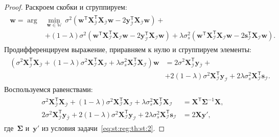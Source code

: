 \documentclass{dissert}
\begin{document}
\begin{proof}
Раскроем скобки и сгруппируем:
\begin{gather}
\label{eq:st:reg:3}
\begin{aligned}
\hat{\mathbf{w}} = \arg&\min_{\mathbf{w}\in \mathbb{W}} ~ \sigma^2\left(\mathbf{w}^{\mathsf{T}}\mathbf{X}^{\mathsf{T}}_{\bar{\mathcal{I}}}\mathbf{X}_{\bar{\mathcal{I}}}\mathbf{w} - 2\mathbf{y}^{\mathsf{T}}_{\bar{\mathcal{I}}}\mathbf{X}_{\bar{\mathcal{I}}}\mathbf{w}\right) +\\
&+ \left(1-\lambda\right)\sigma^2\left(\mathbf{w}^{\mathsf{T}}\mathbf{X}^{\mathsf{T}}_{\mathcal{I}}\mathbf{X}_{\mathcal{I}}\mathbf{w}- 2\mathbf{y}^{\mathsf{T}}_{\mathcal{I}}\mathbf{X}_{\mathcal{I}}\mathbf{w}\right) + \lambda\sigma^2_s\left(\mathbf{w}^{\mathsf{T}}\mathbf{X}^{\mathsf{T}}_{\mathcal{I}}\mathbf{X}_{\mathcal{I}}\mathbf{w}- 2\mathbf{s}^{\mathsf{T}}_{\mathcal{I}}\mathbf{X}_{\mathcal{I}}\mathbf{w}\right).
\end{aligned}
\end{gather}
Продифференцируем выражение, приравняем к нулю и сгруппируем элементы:
\begin{gather}
\label{eq:st:reg:4}
\begin{aligned}
\left(\sigma^{2}\mathbf{X}^{\mathsf{T}}_{\bar{\mathcal{I}}}\mathbf{X}_{\bar{\mathcal{I}}} + \left(1-\lambda\right)\sigma^2\mathbf{X}^{\mathsf{T}}_{\mathcal{I}}\mathbf{X}_{\mathcal{I}} + \lambda\sigma^{2}_s\mathbf{X}^{\mathsf{T}}_{\mathcal{I}}\mathbf{X}_{\mathcal{I}}\right) \mathbf{w}& = 2\sigma^2\mathbf{X}^{\mathsf{T}}_{\bar{\mathcal{I}}}\mathbf{y}_{\bar{\mathcal{I}}}+\\
&+ 2\left(1-\lambda\right)\sigma^2\mathbf{X}^{\mathsf{T}}_{\mathcal{I}}\mathbf{y}_{\mathcal{I}} + 2\lambda\sigma_s^2\mathbf{X}^{\mathsf{T}}_{\mathcal{I}}\mathbf{s}_{\mathcal{I}}.
\end{aligned}
\end{gather}
Воспользуемся равенствами:
\begin{gather}
\label{eq:st:reg:simp}
\begin{aligned}
\sigma^{2}\mathbf{X}^{\mathsf{T}}_{\bar{\mathcal{I}}}\mathbf{X}_{\bar{\mathcal{I}}} + \left(1-\lambda\right)\sigma^2\mathbf{X}^{\mathsf{T}}_{\mathcal{I}}\mathbf{X}_{\mathcal{I}} + \lambda\sigma^{2}_s\mathbf{X}^{\mathsf{T}}_{\mathcal{I}}\mathbf{X}_{\mathcal{I}} &= \mathbf{X}^{\mathsf{T}}\bm{\Sigma}^{-1}\mathbf{X},\\
2\sigma^2\mathbf{X}^{\mathsf{T}}_{\bar{\mathcal{I}}}\mathbf{y}_{\bar{\mathcal{I}}} + 2\left(1-\lambda\right)\sigma^2\mathbf{X}^{\mathsf{T}}_{\mathcal{I}}\mathbf{y}_{\mathcal{I}} + 2\lambda\sigma_s^2\mathbf{X}^{\mathsf{T}}_{\mathcal{I}}\mathbf{s}_{\mathcal{I}} &= 2\mathbf{X}\mathbf{y'},
\end{aligned}
\end{gather}
где~$\bm{\Sigma}$ и~$\mathbf{y'}$ из условия задачи~\eqref{eq:st:reg:th:st:2}.


\end{proof}
\end{document}
